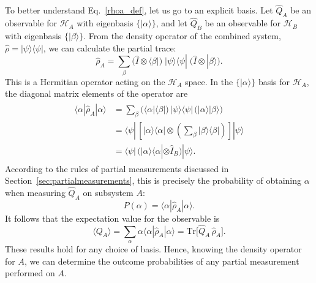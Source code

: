 \documentclass[pra,12pt]{revtex4-2}
\begin{document}
To better understand Eq.~\eqref{rhoa_def}, let us go to an explicit
basis.  Let $\hat{Q}_A$ be an observable for $\mathscr{H}_A$ with
eigenbasis $\{|\alpha\rangle\}$, and let $\hat{Q}_B$ be an observable
for $\mathscr{H}_B$ with eigenbasis $\{|\beta\rangle\}$.  From the
density operator of the combined system, $\hat{\rho} =
|\psi\rangle\langle \psi|$, we can calculate the partial trace:
\begin{equation}
  \hat{\rho}_A =
    \sum_\beta
    \Big( \hat{I}\otimes \langle \beta| \Big)
    \; |\psi\rangle \langle \psi | \;
    \Big( \hat{I}\otimes | \beta\rangle \Big).
    \label{rhoa_explicit}
\end{equation}
This is a Hermitian operator acting on the $\mathscr{H}_A$ space.  In
the $\{|\alpha\rangle\}$ basis for $\mathscr{H}_A$, the diagonal
matrix elements of the operator are
\begin{align}
  \begin{aligned}
    \langle \alpha | \hat{\rho}_A | \alpha \rangle
    &=
    \sum_\beta
    \Big( \langle \alpha| \langle \beta| \Big)
    \, |\psi\rangle \langle \psi | \,
    \Big( |\alpha\rangle | \beta\rangle \Big) \\
    &=
    \langle \psi | \,
    \left[ |\alpha\rangle \langle \alpha| \otimes
      \left(\sum_\beta | \beta\rangle \langle \beta|\right) \right]
    |\psi\rangle \\
    &=
    \langle \psi | \,
    \Big( |\alpha\rangle \langle \alpha| \otimes \hat{I}_B\Big) |\psi\rangle.
  \end{aligned}
\end{align}
According to the rules of partial measurements discussed in
Section~\ref{sec:partialmeasurements}, this is precisely the
probability of obtaining $\alpha$ when measuring $\hat{Q}_A$ on
subsystem $A$:
\begin{equation}
  P(\alpha) = \langle \alpha | \hat{\rho}_A | \alpha \rangle.
  \label{rho_prob}
\end{equation}
It follows that the expectation value for the observable is
\begin{equation}
  \langle Q_A \rangle = \sum_\alpha \alpha
  \langle \alpha | \hat{\rho}_A | \alpha \rangle
  = \mathrm{Tr}\Big[\hat{Q}_A \, \hat{\rho}_A \Big].
  \label{rho_expect}
\end{equation}
These results hold for any choice of basis.  Hence, knowing the
density operator for $A$, we can determine the outcome probabilities
of any partial measurement performed on $A$.
\end{document}
